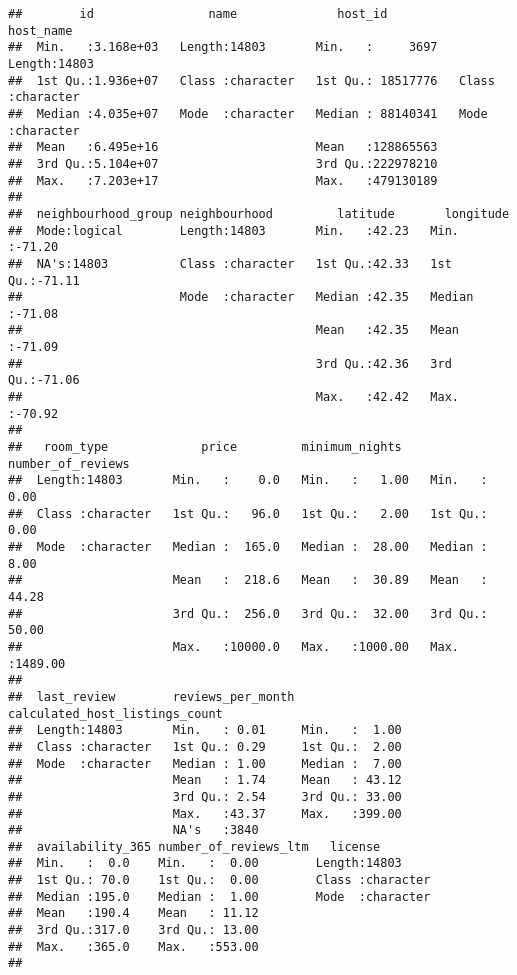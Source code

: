 \documentclass[
]{article}
\begin{document}
\begin{verbatim}
##        id                name              host_id           host_name        
##  Min.   :3.168e+03   Length:14803       Min.   :     3697   Length:14803      
##  1st Qu.:1.936e+07   Class :character   1st Qu.: 18517776   Class :character  
##  Median :4.035e+07   Mode  :character   Median : 88140341   Mode  :character  
##  Mean   :6.495e+16                      Mean   :128865563                     
##  3rd Qu.:5.104e+07                      3rd Qu.:222978210                     
##  Max.   :7.203e+17                      Max.   :479130189                     
##                                                                               
##  neighbourhood_group neighbourhood         latitude       longitude     
##  Mode:logical        Length:14803       Min.   :42.23   Min.   :-71.20  
##  NA's:14803          Class :character   1st Qu.:42.33   1st Qu.:-71.11  
##                      Mode  :character   Median :42.35   Median :-71.08  
##                                         Mean   :42.35   Mean   :-71.09  
##                                         3rd Qu.:42.36   3rd Qu.:-71.06  
##                                         Max.   :42.42   Max.   :-70.92  
##                                                                         
##   room_type             price         minimum_nights    number_of_reviews
##  Length:14803       Min.   :    0.0   Min.   :   1.00   Min.   :   0.00  
##  Class :character   1st Qu.:   96.0   1st Qu.:   2.00   1st Qu.:   0.00  
##  Mode  :character   Median :  165.0   Median :  28.00   Median :   8.00  
##                     Mean   :  218.6   Mean   :  30.89   Mean   :  44.28  
##                     3rd Qu.:  256.0   3rd Qu.:  32.00   3rd Qu.:  50.00  
##                     Max.   :10000.0   Max.   :1000.00   Max.   :1489.00  
##                                                                          
##  last_review        reviews_per_month calculated_host_listings_count
##  Length:14803       Min.   : 0.01     Min.   :  1.00                
##  Class :character   1st Qu.: 0.29     1st Qu.:  2.00                
##  Mode  :character   Median : 1.00     Median :  7.00                
##                     Mean   : 1.74     Mean   : 43.12                
##                     3rd Qu.: 2.54     3rd Qu.: 33.00                
##                     Max.   :43.37     Max.   :399.00                
##                     NA's   :3840                                    
##  availability_365 number_of_reviews_ltm   license         
##  Min.   :  0.0    Min.   :  0.00        Length:14803      
##  1st Qu.: 70.0    1st Qu.:  0.00        Class :character  
##  Median :195.0    Median :  1.00        Mode  :character  
##  Mean   :190.4    Mean   : 11.12                          
##  3rd Qu.:317.0    3rd Qu.: 13.00                          
##  Max.   :365.0    Max.   :553.00                          
## 
\end{verbatim}
\end{document}
